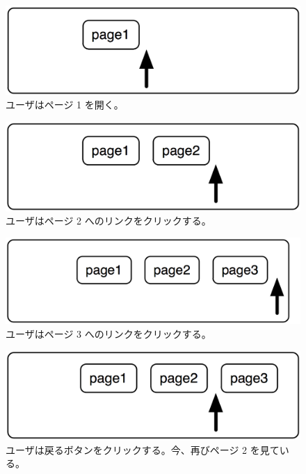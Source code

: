 \documentclass[a4paper,10pt,twoside]{book}
\begin{document}
\begin{figure}[!ht]
\centerline{\includegraphics[scale=0.5]{page1Stef}}
\caption{ユーザはページ 1 を開く。}
\vspace{.2in}
\end{figure}

\begin{figure}[!ht]
\centerline{\includegraphics[scale=0.5]{page2Stef}}
\caption{ユーザはページ 2 へのリンクをクリックする。}
\vspace{.2in}
\end{figure}

\begin{figure}[!ht]
\centerline{\includegraphics[scale=0.5]{page3Stef}}
\caption{ユーザはページ 3 へのリンクをクリックする。}
\vspace{.2in}
\end{figure}

\begin{figure}[!ht]
\centerline{\includegraphics[scale=0.5]{page2_Stef}}
\caption{ユーザは戻るボタンをクリックする。今、再びページ 2 を見ている。}
\vspace{.2in}
\end{figure}
\end{document}
